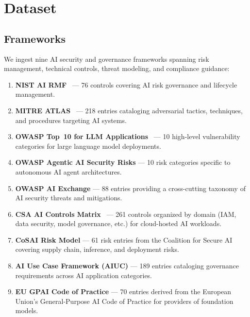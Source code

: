 \section{Dataset}
\label{sec:dataset}

\subsection{Frameworks}

We ingest nine AI security and governance frameworks spanning risk
management, technical controls, threat modeling, and compliance guidance:

\begin{enumerate}
    \item \textbf{NIST AI RMF}~\citep{nist_ai_rmf} --- 76 controls
          covering AI risk governance and lifecycle management.
    \item \textbf{MITRE ATLAS}~\citep{mitre_atlas} --- 218 entries
          cataloging adversarial tactics, techniques, and procedures
          targeting AI systems.
    \item \textbf{OWASP Top~10 for LLM Applications}~\citep{owasp_llm_top10}
          --- 10 high-level vulnerability categories for large language
          model deployments.
    \item \textbf{OWASP Agentic AI Security Risks} --- 10 risk
          categories specific to autonomous AI agent architectures.
    \item \textbf{OWASP AI Exchange} --- 88 entries providing a
          cross-cutting taxonomy of AI security threats and mitigations.
    \item \textbf{CSA AI Controls Matrix}~\citep{csa_aicm} --- 261
          controls organized by domain (IAM, data security, model
          governance, etc.) for cloud-hosted AI workloads.
    \item \textbf{CoSAI Risk Model} --- 61 risk entries from the
          Coalition for Secure AI covering supply chain, inference,
          and deployment risks.
    \item \textbf{AI Use Case Framework (AIUC)} --- 189 entries
          cataloging governance requirements across AI application
          categories.
    \item \textbf{EU GPAI Code of Practice} --- 70 entries derived
          from the European Union's General-Purpose AI Code of Practice
          for providers of foundation models.
\end{enumerate}

